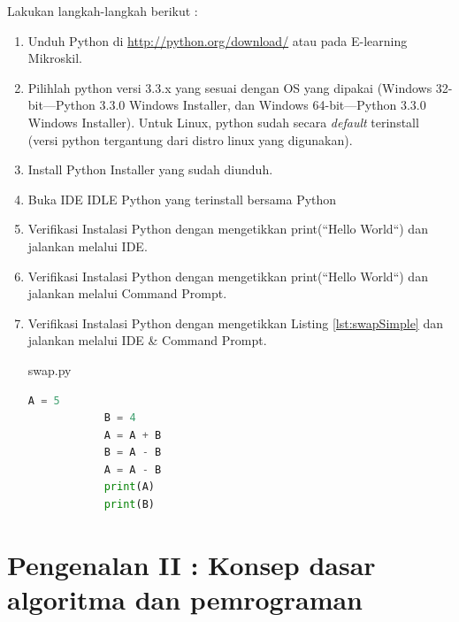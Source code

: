 \begin{pemrograman}
Lakukan langkah-langkah berikut :
\begin{enumerate}
	\item Unduh Python di \url{http://python.org/download/} atau pada E-learning Mikroskil.
	\item Pilihlah python versi 3.3.x yang sesuai dengan OS yang dipakai (Windows 32-bit---Python 3.3.0 Windows Installer, dan Windows 64-bit---Python 3.3.0 Windows Installer). Untuk Linux, python sudah secara \textit{default} terinstall (versi python tergantung dari distro linux yang digunakan).
	\item Install Python Installer yang sudah diunduh.
	\item Buka IDE IDLE Python yang terinstall bersama Python	%
	\item Verifikasi Instalasi Python dengan mengetikkan print(``Hello World``) dan jalankan melalui IDE.
	\item Verifikasi Instalasi Python dengan mengetikkan print(``Hello World``) dan jalankan melalui Command Prompt.
	\item Verifikasi Instalasi Python dengan mengetikkan Listing \ref{lst:swapSimple} dan jalankan melalui IDE \& Command Prompt.
		\begin{listprog}{swap.py}
		\label{lst:swapSimple}
		\begin{lstlisting}[language=Python]
			A = 5
			B = 4
			A = A + B
			B = A - B
			A = A - B
			print(A)
			print(B)
		\end{lstlisting}
\end{listprog}
\end{enumerate}
\end{pemrograman}



\newpage
\chapter{Pengenalan II : Konsep dasar algoritma dan pemrograman}\label{ch:pengantarAlgoritma2}


